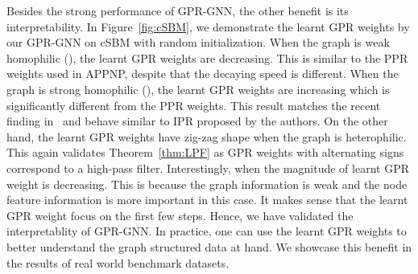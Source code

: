 \documentclass{article} \usepackage{iclr2021_conference,times}
\begin{document}
Besides the strong performance of GPR-GNN, the other benefit is its interpretability. In Figure~\ref{fig:cSBM}, we demonstrate the learnt GPR weights by our GPR-GNN on cSBM with random initialization. When the graph is weak homophilic (), the learnt GPR weights are decreasing. This is similar to the PPR weights used in APPNP, despite that the decaying speed is different. When the graph is strong homophilic (), the learnt GPR weights are increasing which is significantly different from the PPR weights. This result matches the recent finding in~\cite{li2019optimizing} and behave similar to IPR proposed by the authors. On the other hand, the learnt GPR weights have zig-zag shape when the graph is heterophilic. This again validates Theorem~\ref{thm:LPF} as GPR weights with alternating signs correspond to a high-pass filter. Interestingly, when  the magnitude of learnt GPR weight is decreasing. This is because the graph information is weak and the node feature information is more important in this case. It makes sense that the learnt GPR weight focus on the first few steps. Hence, we have validated the interpretablity of GPR-GNN. In practice, one can use the learnt GPR weights to better understand the graph structured data at hand. We showcase this benefit in the results of real world benchmark datasets.

\begin{figure*}[t]
  \centering
{}
  \vspace{-0.2cm}
  \caption{ Figure (a)-(d) shows the learnt GPR weights by GPR-GNN with random initialization on cSBM, dense split. The shaded region indicates  confidence interval.}\label{fig:cSBM}
  \vspace{-0.6cm}
\end{figure*}
\end{document}
